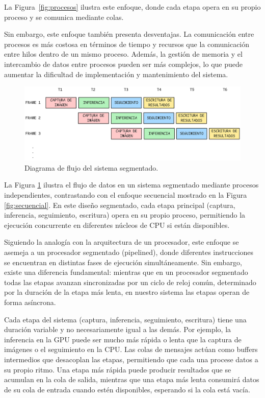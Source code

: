 \documentclass[11pt,spanish,listoffigures,listoftables]{tfgetsinf}
\begin{document}
La Figura~\ref{fig:procesos} ilustra este enfoque, donde cada etapa opera en su propio proceso y se comunica mediante colas.

Sin embargo, este enfoque también presenta desventajas. La comunicación entre procesos es más costosa en términos de tiempo y recursos que la comunicación entre hilos dentro de un mismo proceso. Además, la gestión de memoria y el intercambio de datos entre procesos pueden ser más complejos, lo que puede aumentar la dificultad de implementación y mantenimiento del sistema.

\begin{figure}[H]
   \centering
   \includegraphics[width=1\textwidth]{images/diseno_e_implementacion/segmentacion.png}
   \caption[Diagrama de flujo del sistema segmentado]{Diagrama de flujo del sistema segmentado.}
   \label{fig:segmentacion}
\end{figure}

La Figura \ref{fig:segmentacion} ilustra el flujo de datos en un sistema segmentado mediante procesos independientes, contrastando con el enfoque secuencial mostrado en la Figura \ref{fig:secuencial}. En este diseño segmentado, cada etapa principal (captura, inferencia, seguimiento, escritura) opera en su propio proceso, permitiendo la ejecución concurrente en diferentes núcleos de CPU si están disponibles.

Siguiendo la analogía con la arquitectura de un procesador, este enfoque se asemeja a un procesador segmentado (pipelined), donde diferentes instrucciones se encuentran en distintas fases de ejecución simultáneamente. Sin embargo, existe una diferencia fundamental: mientras que en un procesador segmentado todas las etapas avanzan sincronizadas por un ciclo de reloj común, determinado por la duración de la etapa más lenta, en nuestro sistema las etapas operan de forma asíncrona.

Cada etapa del sistema (captura, inferencia, seguimiento, escritura) tiene una duración variable y no necesariamente igual a las demás. Por ejemplo, la inferencia en la GPU puede ser mucho más rápida o lenta que la captura de imágenes o el seguimiento en la CPU. Las colas de mensajes actúan como buffers intermedios que desacoplan las etapas, permitiendo que cada una procese datos a su propio ritmo. Una etapa más rápida puede producir resultados que se acumulan en la cola de salida, mientras que una etapa más lenta consumirá datos de su cola de entrada cuando estén disponibles, esperando si la cola está vacía.
\end{document}
